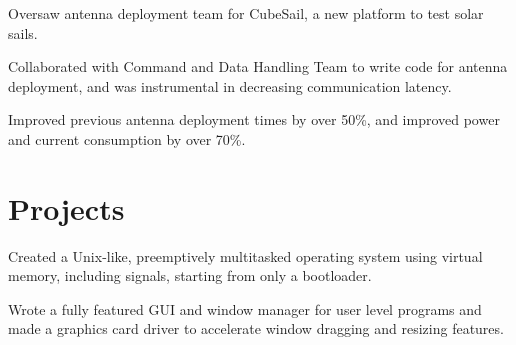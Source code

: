 \documentclass[]{deedy-resume-openfont}
\begin{document}
\begin{minipage}[t]{0.66\textwidth}
\begin{tightemize}
\item Oversaw antenna deployment team for CubeSail, a new platform to test solar sails.
\item Collaborated with  Command and Data Handling Team to write code for antenna deployment, and was instrumental in decreasing communication latency.
\item Improved previous antenna deployment times by over 50\%, and improved power and current consumption by over 70\%.
\end{tightemize}
\sectionsep



\section{Projects}

\begin{tightemize}
\item Created a Unix-like, preemptively multitasked operating system using virtual memory, including signals, starting from only a bootloader.
\item Wrote a fully featured GUI and window manager for user level programs and made a graphics card driver to accelerate window dragging and resizing features.
\end{tightemize}


\end{minipage}
\end{document}
